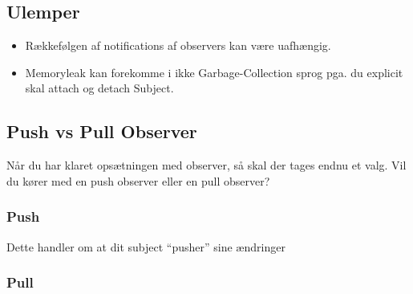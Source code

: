 \documentclass[../SWD_disp.tex]{subfiles}
\begin{document}
\subsection*{Ulemper}
\begin{itemize}
    \item Rækkefølgen af notifications af observers kan være uafhængig.
    \item Memoryleak kan forekomme i ikke Garbage-Collection sprog pga. du explicit skal attach og detach Subject.
\end{itemize}
\subsection{Push vs Pull Observer}
Når du har klaret opsætningen med observer, så skal der tages endnu et valg. Vil du kører med en push observer eller en pull observer?
\subsubsection{Push}
Dette handler om at dit subject ``pusher'' sine ændringer 
\subsubsection{Pull}





\end{document}
